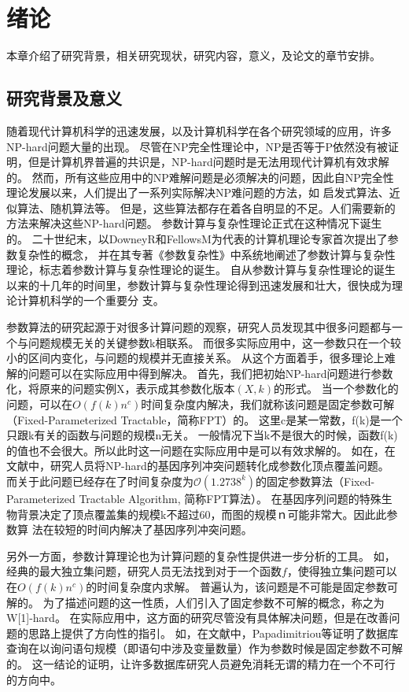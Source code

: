 ﻿\chapter{绪论}
本章介绍了研究背景，相关研究现状，研究内容，意义，及论文的章节安排。

\section{研究背景及意义}
随着现代计算机科学的迅速发展，以及计算机科学在各个研究领域的应用，许多NP-hard问题大量的出现。
尽管在NP完全性理论中，NP是否等于P依然没有被证明，但是计算机界普遍的共识是，NP-hard问题时是无法用现代计算机有效求解的。
然而，所有这些应用中的NP难解问题是必须解决的问题，因此自NP完全性理论发展以来，人们提出了一系列实际解决NP难问题的方法，如
启发式算法、近似算法、随机算法等。
但是，这些算法都存在着各自明显的不足。人们需要新的方法来解决这些NP-hard问题。
参数计算与复杂性理论正式在这种情况下诞生的。
二十世纪末，以DowneyR和FellowsM为代表的计算机理论专家首次提出了参数复杂性的概念，
并在其专著《参数复杂性》中系统地阐述了参数计算与复杂性理论，标志着参数计算与复杂性理论的诞生。
自从参数计算与复杂性理论的诞生以来的十几年的时间里，参数计算与复杂性理论得到迅速发展和壮大，很快成为理论计算机科学的一个重要分
支。

参数算法的研究起源于对很多计算问题的观察，研究人员发现其中很多问题都与一个与问题规模无关的关键参数k相联系。
而很多实际应用中，这一参数只在一个较小的区间内变化，与问题的规模并无直接关系。
从这个方面着手，很多理论上难解的问题可以在实际应用中得到解决。
首先，我们把初始NP-hard问题进行参数化，将原来的问题实例X，表示成其参数化版本$(X, k)$的形式。
当一个参数化的问题，可以在$O(f(k)n^c)$时间复杂度内解决，我们就称该问题是固定参数可解（Fixed-Parameterized Tractable，简称FPT）的。
这里c是某一常数，f(k)是一个只跟k有关的函数与问题的规模n无关。
一般情况下当k不是很大的时候，函数f(k)的值也不会很大。所以此时这一问题在实际应用中是可以有效求解的。
如在，在文献\cite{gonnet2000darwin}中，研究人员将NP-hard的基因序列冲突问题转化成参数化顶点覆盖问题。
而关于此问题已经存在了时间复杂度为$\mathcal{O}(1.2738^k)$的固定参数算法（Fixed-Parameterized Tractable Algorithm, 简称FPT算法）。
在基因序列问题的特殊生物背景决定了顶点覆盖集的规模k不超过60，而图的规模ｎ可能非常大。因此此参数算
法在较短的时间内解决了基因序列冲突问题。

另外一方面，参数计算理论也为计算问题的复杂性提供进一步分析的工具。
如，经典的最大独立集问题，研究人员无法找到对于一个函数$f$，使得独立集问题可以在$O(f(k)n^c)$的时间复杂度内求解。
普遍认为，该问题是不可能是固定参数可解的。
为了描述问题的这一性质，人们引入了固定参数不可解的概念，称之为W[1]-hard。
在实际应用中，这方面的研究尽管没有具体解决问题，但是在改善问题的思路上提供了方向性的指引。
如，在文献\cite{papadimitriou1997complexity}中，Papadimitriou等证明了数据库查询在以询问语句规模（即语句中涉及变量数量）作为参数时候是固定参数不可解的。
这一结论的证明，让许多数据库研究人员避免消耗无谓的精力在一个不可行的方向中。


